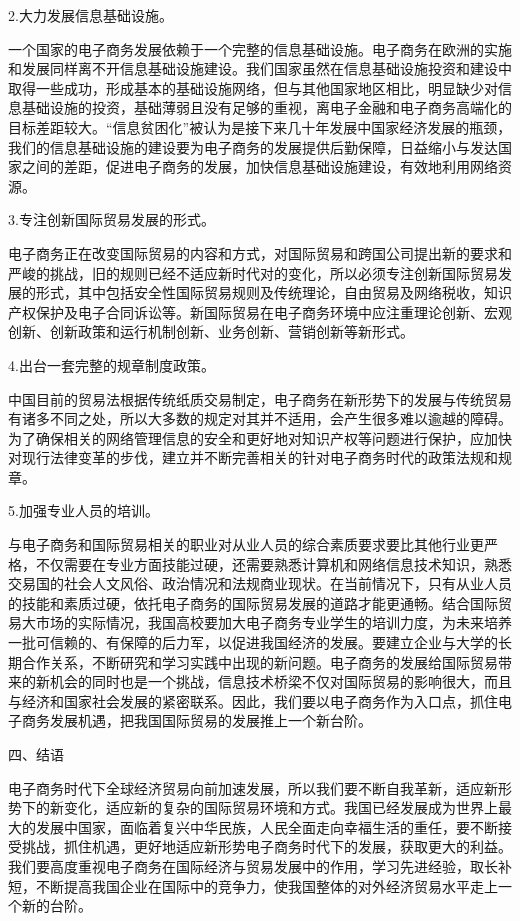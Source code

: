 2.大力发展信息基础设施。

一个国家的电子商务发展依赖于一个完整的信息基础设施。电子商务在欧洲的实施和发展同样离不开信息基础设施建设。我们国家虽然在信息基础设施投资和建设中取得一些成功，形成基本的基础设施网络，但与其他国家地区相比，明显缺少对信息基础设施的投资，基础薄弱且没有足够的重视，离电子金融和电子商务高端化的目标差距较大。“信息贫困化”被认为是接下来几十年发展中国家经济发展的瓶颈，我们的信息基础设施的建设要为电子商务的发展提供后勤保障，日益缩小与发达国家之间的差距，促进电子商务的发展，加快信息基础设施建设，有效地利用网络资源。

3.专注创新国际贸易发展的形式。

电子商务正在改变国际贸易的内容和方式，对国际贸易和跨国公司提出新的要求和严峻的挑战，旧的规则已经不适应新时代对的变化，所以必须专注创新国际贸易发展的形式，其中包括安全性国际贸易规则及传统理论，自由贸易及网络税收，知识产权保护及电子合同诉讼等。新国际贸易在电子商务环境中应注重理论创新、宏观创新、创新政策和运行机制创新、业务创新、营销创新等新形式。

4.出台一套完整的规章制度政策。

中国目前的贸易法根据传统纸质交易制定，电子商务在新形势下的发展与传统贸易有诸多不同之处，所以大多数的规定对其并不适用，会产生很多难以逾越的障碍。为了确保相关的网络管理信息的安全和更好地对知识产权等问题进行保护，应加快对现行法律变革的步伐，建立并不断完善相关的针对电子商务时代的政策法规和规章。

5.加强专业人员的培训。

与电子商务和国际贸易相关的职业对从业人员的综合素质要求要比其他行业更严格，不仅需要在专业方面技能过硬，还需要熟悉计算机和网络信息技术知识，熟悉交易国的社会人文风俗、政治情况和法规商业现状。在当前情况下，只有从业人员的技能和素质过硬，依托电子商务的国际贸易发展的道路才能更通畅。结合国际贸易大市场的实际情况，我国高校要加大电子商务专业学生的培训力度，为未来培养一批可信赖的、有保障的后力军，以促进我国经济的发展。要建立企业与大学的长期合作关系，不断研究和学习实践中出现的新问题。电子商务的发展给国际贸易带来的新机会的同时也是一个挑战，信息技术桥梁不仅对国际贸易的影响很大，而且与经济和国家社会发展的紧密联系。因此，我们要以电子商务作为入口点，抓住电子商务发展机遇，把我国国际贸易的发展推上一个新台阶。

四、结语

电子商务时代下全球经济贸易向前加速发展，所以我们要不断自我革新，适应新形势下的新变化，适应新的复杂的国际贸易环境和方式。我国已经发展成为世界上最大的发展中国家，面临着复兴中华民族，人民全面走向幸福生活的重任，要不断接受挑战，抓住机遇，更好地适应新形势电子商务时代下的发展，获取更大的利益。我们要高度重视电子商务在国际经济与贸易发展中的作用，学习先进经验，取长补短，不断提高我国企业在国际中的竞争力，使我国整体的对外经济贸易水平走上一个新的台阶。